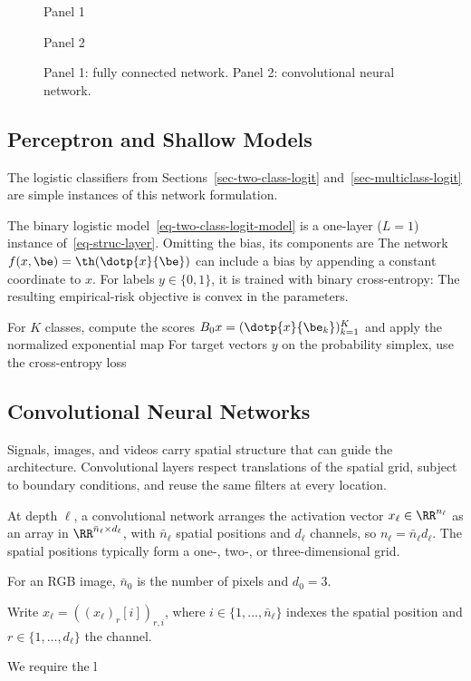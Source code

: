 \begin{figure}[tbp]
\centering
{\small\sffamily\color{BookMuted}Panel 1\par}\smallskip
{}
\par\medskip
{\small\sffamily\color{BookMuted}Panel 2\par}\smallskip
{}
\caption{Panel 1: fully connected network.
Panel 2: convolutional neural network.}
\label{fig-deep-fc-cnn}
\end{figure}


                                          
\subsection{Perceptron and Shallow Models}

The logistic classifiers from Sections~\ref{sec-two-class-logit} and~\ref{sec-multiclass-logit} are simple instances of this network formulation.

The binary logistic model~\eqref{eq-two-class-logit-model} is a one-layer ($L=1$) instance of~\eqref{eq-struc-layer}. Omitting the bias, its components are
The network $f(x,\be) = \th(\dotp{x}{\be})$ can include a bias by appending a constant coordinate to $x$. For labels $y \in \{0,1\}$, it is trained with binary cross-entropy:
The resulting empirical-risk objective is convex in the parameters.

For $K$ classes, compute the scores $B_0 x = (\dotp{x}{\be_k})_{k=1}^K$ and apply the normalized exponential map
For target vectors $y$ on the probability simplex, use the cross-entropy loss

                                          
\subsection{Convolutional Neural Networks}
\label{sec-cnn}

Signals, images, and videos carry spatial structure that can guide the architecture. Convolutional layers respect translations of the spatial grid, subject to boundary conditions, and reuse the same filters at every location.

At depth $\ell$, a convolutional network arranges the activation vector $x_\ell\in\RR^{n_\ell}$ as an array in $\RR^{\bar n_\ell\times d_\ell}$, with $\bar n_\ell$ spatial positions and $d_\ell$ channels, so $n_\ell=\bar n_\ell d_\ell$. The spatial positions typically form a one-, two-, or three-dimensional grid.
 
For an RGB image, $\bar n_0$ is the number of pixels and $d_0=3$.
 
Write $x_\ell = ( (x_\ell)_r[i] )_{r,i}$, where $i \in \{1,\ldots,\bar n_\ell\}$ indexes the spatial position and $r \in \{1,\ldots,d_\ell\}$ the channel.

We require the l